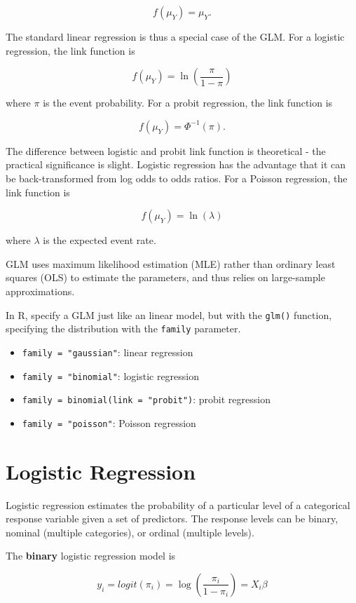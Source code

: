 \documentclass[
]{book}
\providecommand{\tightlist}{%
  \setlength{\itemsep}{0pt}\setlength{\parskip}{0pt}}
\begin{document}
\[f(\mu_Y) = \mu_Y.\]

The standard linear regression is thus a special case of the GLM. For a logistic regression, the link function is

\[f(\mu_Y) = \ln(\frac{\pi}{1-\pi})\]

where \(\pi\) is the event probability. For a probit regression, the link function is

\[f(\mu_Y) = \Phi^{-1}(\pi).\]

The difference between logistic and probit link function is theoretical - the practical significance is slight. Logistic regression has the advantage that it can be back-transformed from log odds to odds ratios. For a Poisson regression, the link function is

\[f(\mu_Y) = \ln(\lambda)\]

where \(\lambda\) is the expected event rate.

GLM uses maximum likelihood estimation (MLE) rather than ordinary least squares (OLS) to estimate the parameters, and thus relies on large-sample approximations.

In R, specify a GLM just like an linear model, but with the \texttt{glm()} function, specifying the distribution with the \texttt{family} parameter.

\begin{itemize}
\tightlist
\item
  \texttt{family\ =\ "gaussian"}: linear regression
\item
  \texttt{family\ =\ "binomial"}: logistic regression
\item
  \texttt{family\ =\ binomial(link\ =\ "probit")}: probit regression
\item
  \texttt{family\ =\ "poisson"}: Poisson regression
\end{itemize}

\hypertarget{logistic-regression}{%
\section{Logistic Regression}\label{logistic-regression}}

Logistic regression estimates the probability of a particular level of a categorical response variable given a set of predictors. The response levels can be binary, nominal (multiple categories), or ordinal (multiple levels).

The \textbf{binary} logistic regression model is

\[y_i = logit(\pi_i) = \log\left(\frac{\pi_i}{1-\pi_i}\right) = X_i\beta\]
\end{document}
